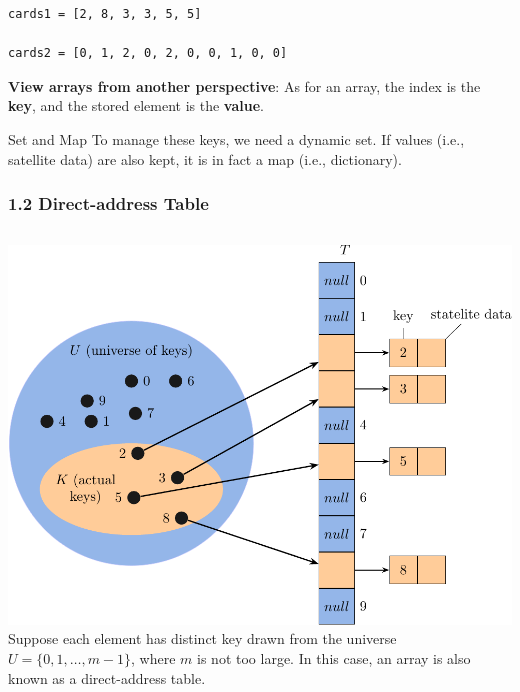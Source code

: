 \documentclass[aspectratio=169, 14pt]{beamer}
\begin{document}
\begin{frame}[fragile]

    \begin{verbatim}
cards1 = [2, 8, 3, 3, 5, 5]

cards2 = [0, 1, 2, 0, 2, 0, 0, 1, 0, 0]
    \end{verbatim}

    \textbf{ View arrays from another perspective}: As for an array, the \alert{index} is the \textbf{key}, and the stored element is the \textbf{value}. 
    
    \begin{exampleblock}{Set and Map}
To manage these keys, we need a dynamic \alert{set}. If values (i.e., satellite data) are also kept, it is in fact a \alert{map} (i.e., dictionary).
    \end{exampleblock}

\end{frame}



\begin{frame}[fragile]
    \frametitle{1.2 Direct-address Table}

\begin{columns}

    \includegraphics[width=.98\textwidth]{week11/direct}
    Suppose each element has distinct key drawn from the universe $U = \{0, 1, \dots, m - 1\}$, where $m$ is not too large. In this case, an array is also known as a \alert{direct-address table}.
\end{columns}

\end{frame}
\end{document}
